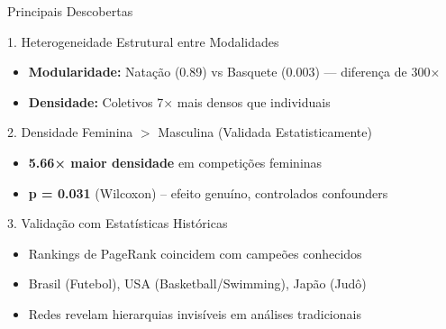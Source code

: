\begin{frame}{Principais Descobertas}
    \begin{block}{1. Heterogeneidade Estrutural entre Modalidades}
        \footnotesize
        \begin{itemize}
            \item \textbf{Modularidade:} Natação (0.89) vs Basquete (0.003) --- diferença de 300×
            \item \textbf{Densidade:} Coletivos 7× mais densos que individuais
        \end{itemize}
    \end{block}

    \vspace{0.15cm}

    \begin{block}{2. Densidade Feminina $>$ Masculina (Validada Estatisticamente)}
        \footnotesize
        \begin{itemize}
            \item \textbf{5.66× maior densidade} em competições femininas
            \item \textbf{p = 0.031} (Wilcoxon) -- efeito genuíno, controlados confounders
        \end{itemize}
    \end{block}

    \vspace{0.15cm}

    \begin{block}{3. Validação com Estatísticas Históricas}
        \footnotesize
        \begin{itemize}
            \item Rankings de PageRank coincidem com campeões conhecidos
            \item Brasil (Futebol), USA (Basketball/Swimming), Japão (Judô)
            \item Redes revelam hierarquias invisíveis em análises tradicionais
        \end{itemize}
    \end{block}
\end{frame}

